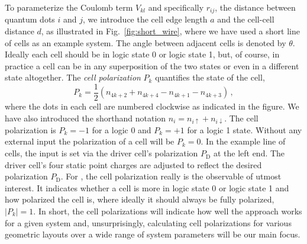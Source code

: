 To parameterize the Coulomb term $V_{kl}$ and specifically $r_{ij}$, the
distance between quantum dots $i$ and $j$, we introduce the cell edge length $a$
and the cell-cell distance $d$, as illustrated in Fig.~\ref{fig:short_wire},
where we have used a short line of cells as an example  system. The
angle between adjacent cells is denoted by $\theta$. Ideally each cell should be
in logic state 0 or logic state 1, but, of course, in practice a cell can be in
any superposition of the two states or even in a different state altogether. The
\emph{cell polarization} $P_k$ quantifies the state of the cell,
\begin{equation}
  \label{eq:polarization}
  P_k =
  \frac{1}{2} \left( n_{4k+2} + n_{4k+4} - n_{4k+1} - n_{4k+3} \right) \, ,
\end{equation}
where the dots in each cell are numbered clockwise as indicated
in the figure. We have also introduced the shorthand notation $n_i =
n_{i\uparrow} + n_{i\downarrow}$. The cell polarization is $P_k = -1$ for a
logic 0 and $P_k = +1$ for a logic 1 state. Without any external input the
polarization of a cell will be $P_k = 0$. In the example line of cells, the
input is set via the driver cell's polarization $P_\text{D}$ at the left end. The
driver cell's four static point charges are adjusted to reflect the desired
polarization $P_\text{D}$. For , the cell polarization really is the
observable of utmost interest. It indicates whether a cell is more in logic
state 0 or logic state 1 and how polarized the cell is, where ideally it should
always be fully polarized, $|P_k| = 1$. In short, the cell polarizations will
indicate how well the  approach works for a given system and,
unsurprisingly, calculating cell polarizations for various geometric layouts
over a wide range of system parameters will be our main focus.

